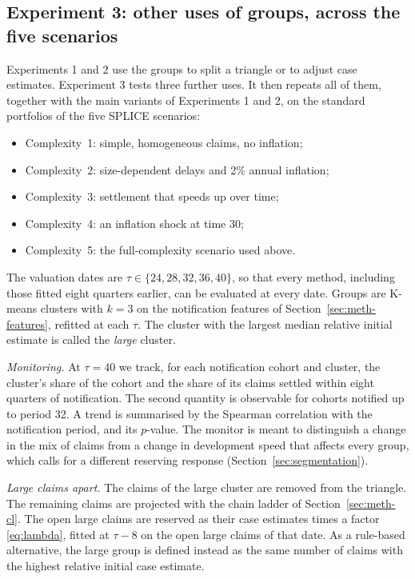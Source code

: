 \subsection{Experiment 3: other uses of groups, across the five scenarios}
\label{sec:meth-uses}

Experiments 1 and 2 use the groups to split a triangle or to adjust case estimates. Experiment 3 tests three further uses. It then repeats all of them, together with the main variants of Experiments 1 and 2, on the standard portfolios of the five SPLICE scenarios:
\begin{itemize}[leftmargin=*]
\item Complexity~1: simple, homogeneous claims, no inflation;
\item Complexity~2: size-dependent delays and 2\% annual inflation;
\item Complexity~3: settlement that speeds up over time;
\item Complexity~4: an inflation shock at time 30;
\item Complexity~5: the full-complexity scenario used above.
\end{itemize}
The valuation dates are $\tau \in \{24, 28, 32, 36, 40\}$, so that every method, including those fitted eight quarters earlier, can be evaluated at every date. Groups are K-means clusters with $k=3$ on the notification features of Section~\ref{sec:meth-features}, refitted at each $\tau$. The cluster with the largest median relative initial estimate is called the \emph{large} cluster.

\emph{Monitoring.} At $\tau = 40$ we track, for each notification cohort and cluster, the cluster's share of the cohort and the share of its claims settled within eight quarters of notification. The second quantity is observable for cohorts notified up to period 32. A trend is summarised by the Spearman correlation with the notification period, and its $p$-value. The monitor is meant to distinguish a change in the mix of claims from a change in development speed that affects every group, which calls for a different reserving response (Section~\ref{sec:segmentation}).

\emph{Large claims apart.} The claims of the large cluster are removed from the triangle. The remaining claims are projected with the chain ladder of Section~\ref{sec:meth-cl}. The open large claims are reserved as their case estimates times a factor \eqref{eq:lambda}, fitted at $\tau - 8$ on the open large claims of that date. As a rule-based alternative, the large group is defined instead as the same number of claims with the highest relative initial case estimate.

